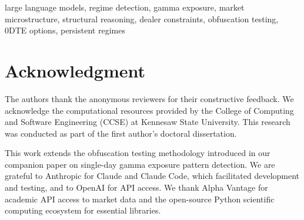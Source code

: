 \documentclass[conference]{IEEEtran}
\begin{document}
\begin{IEEEkeywords}
large language models, regime detection, gamma exposure, market microstructure, structural reasoning, dealer constraints, obfuscation testing, 0DTE options, persistent regimes
\end{IEEEkeywords}






\FloatBarrier




\FloatBarrier


\FloatBarrier



\section*{Acknowledgment}
The authors thank the anonymous reviewers for their constructive feedback. We acknowledge the computational resources provided by the College of Computing and Software Engineering (CCSE) at Kennesaw State University. This research was conducted as part of the first author's doctoral dissertation.

This work extends the obfuscation testing methodology introduced in our companion paper on single-day gamma exposure pattern detection. We are grateful to Anthropic for Claude and Claude Code, which facilitated development and testing, and to OpenAI for API access. We thank Alpha Vantage for academic API access to market data and the open-source Python scientific computing ecosystem for essential libraries.

\FloatBarrier


\end{document}
